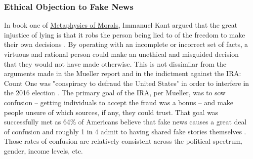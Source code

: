 \documentclass[12pt]{article}
\begin{document}
\subsubsection{Ethical Objection to Fake News}
In book one of \underline{Metaphysics of Morals}, Immanuel Kant argued that the great injustice of lying is that it robs the person being lied to of the freedom to make their own decisions \cite{kant1996metaphysics}. By operating with an incomplete or incorrect set of facts, a virtuous and rational person could make an unethical and misguided decision that they would not have made otherwise. This is not dissimilar from the arguments made in the Mueller report and in the indictment against the IRA: Count One was "conspiracy to defraud the United States" in order to interfere in the 2016 election  \cite{mueller2019mueller,mueller2020internet}. The primary goal of the IRA, per Mueller, was to sow confusion -- getting individuals to accept the fraud was a bonus -- and make people unsure of which sources, if any, they could trust. That goal was successfully met as 64\% of Americans believe that fake news causes a great deal of confusion and roughly 1 in 4 admit to having shared fake stories themselves \cite{barthel2016americans}. Those rates of confusion are relatively consistent across the political spectrum, gender, income levels, etc. 
\end{document}
